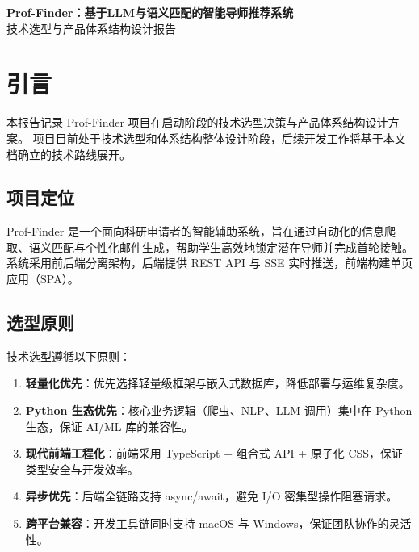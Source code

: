 \documentclass[11pt]{article}
\begin{document}
\begin{center}
{\LARGE\bfseries Prof-Finder：基于LLM与语义匹配的智能导师推荐系统} \\[6pt]
{\large 技术选型与产品体系结构设计报告}
\end{center}

\vspace{5mm}

\newpage
\pagestyle{plain}
\setcounter{page}{1}

\section{引言}

本报告记录 Prof-Finder 项目在启动阶段的技术选型决策与产品体系结构设计方案。
项目目前处于技术选型和体系结构整体设计阶段，后续开发工作将基于本文档确立的技术路线展开。

\subsection{项目定位}

Prof-Finder 是一个面向科研申请者的智能辅助系统，旨在通过自动化的信息爬取、语义匹配与个性化邮件生成，帮助学生高效地锁定潜在导师并完成首轮接触。
系统采用前后端分离架构，后端提供 REST API 与 SSE 实时推送，前端构建单页应用（SPA）。

\subsection{选型原则}

技术选型遵循以下原则：

\begin{enumerate}
    \item \textbf{轻量化优先}：优先选择轻量级框架与嵌入式数据库，降低部署与运维复杂度。
    \item \textbf{Python 生态优先}：核心业务逻辑（爬虫、NLP、LLM 调用）集中在 Python 生态，保证 AI/ML 库的兼容性。
    \item \textbf{现代前端工程化}：前端采用 TypeScript + 组合式 API + 原子化 CSS，保证类型安全与开发效率。
    \item \textbf{异步优先}：后端全链路支持 async/await，避免 I/O 密集型操作阻塞请求。
    \item \textbf{跨平台兼容}：开发工具链同时支持 macOS 与 Windows，保证团队协作的灵活性。
\end{enumerate}
\end{document}
